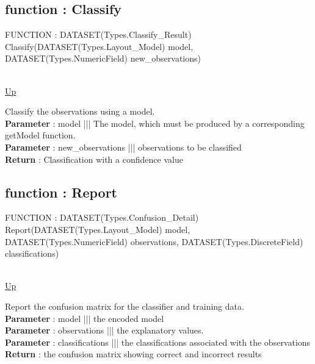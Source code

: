 \subsection*{function : Classify}
\hypertarget{ecldoc:ml_core.interfaces.iclassify.classify}{FUNCTION : DATASET(Types.Classify\_Result) Classify(DATASET(Types.Layout\_Model) model, DATASET(Types.NumericField) new\_observations)} \\
\hyperlink{ecldoc:ML_Core.Interfaces.IClassify}{Up} \\
\par
Classify the observations using a model. \\
\textbf{Parameter} : model ||| The model, which must be produced by a corresponding getModel function. \\
\textbf{Parameter} : new\_observations ||| observations to be classified \\
\textbf{Return} : Classification with a confidence value \\
\subsection*{function : Report}
\hypertarget{ecldoc:ml_core.interfaces.iclassify.report}{FUNCTION : DATASET(Types.Confusion\_Detail) Report(DATASET(Types.Layout\_Model) model, DATASET(Types.NumericField) observations, DATASET(Types.DiscreteField) classifications)} \\
\hyperlink{ecldoc:ML_Core.Interfaces.IClassify}{Up} \\
\par
Report the confusion matrix for the classifier and training data. \\
\textbf{Parameter} : model ||| the encoded model \\
\textbf{Parameter} : observations ||| the explanatory values. \\
\textbf{Parameter} : classifications ||| the classifications associated with the observations \\
\textbf{Return} : the confusion matrix showing correct and incorrect results \\

